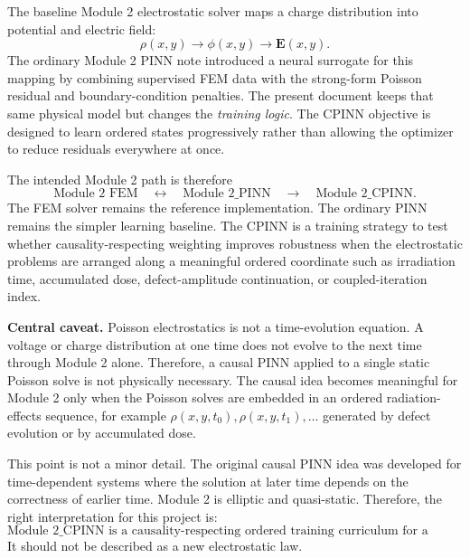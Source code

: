\documentclass[11pt]{article}
\newcommand{\Evec}{\mathbf{E}}
\begin{document}
The baseline Module 2 electrostatic solver maps a charge distribution into potential and electric field:
\begin{equation}
\rho(x,y) \longrightarrow \phi(x,y) \longrightarrow \Evec(x,y).
\end{equation}
The ordinary Module 2 PINN note introduced a neural surrogate for this mapping by combining supervised FEM data with the strong-form Poisson residual and boundary-condition penalties. The present document keeps that same physical model but changes the \emph{training logic}. The CPINN objective is designed to learn ordered states progressively rather than allowing the optimizer to reduce residuals everywhere at once.

The intended Module 2 path is therefore
\begin{equation}
\text{Module 2 FEM} \quad \longleftrightarrow \quad \text{Module 2\_PINN} \quad \longrightarrow \quad \text{Module 2\_CPINN}.
\end{equation}
The FEM solver remains the reference implementation. The ordinary PINN remains the simpler learning baseline. The CPINN is a training strategy to test whether causality-respecting weighting improves robustness when the electrostatic problems are arranged along a meaningful ordered coordinate such as irradiation time, accumulated dose, defect-amplitude continuation, or coupled-iteration index.

\begin{physicsbox}
\textbf{Central caveat.} Poisson electrostatics is not a time-evolution equation. A voltage or charge distribution at one time does not evolve to the next time through Module 2 alone. Therefore, a causal PINN applied to a single static Poisson solve is not physically necessary. The causal idea becomes meaningful for Module 2 only when the Poisson solves are embedded in an ordered radiation-effects sequence, for example $\rho(x,y,t_0),\rho(x,y,t_1),\ldots$ generated by defect evolution or by accumulated dose.
\end{physicsbox}

This point is not a minor detail. The original causal PINN idea was developed for time-dependent systems where the solution at later time depends on the correctness of earlier time. Module 2 is elliptic and quasi-static. Therefore, the right interpretation for this project is:
\begin{equation}
\boxed{\text{Module 2\_CPINN is a causality-respecting ordered training curriculum for a sequence of quasi-static Poisson problems.}}
\end{equation}
It should not be described as a new electrostatic law.
\end{document}
